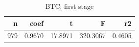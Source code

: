 \begin{table}
\caption{BTC: first stage}
\label{tab:t7_first_stage_BTC}
\begin{tabular}{rrrrr}
\toprule
n & coef & t & F & r2 \\
\midrule
979 & 0.9670 & 17.8971 & 320.3067 & 0.4605 \\
\bottomrule
\end{tabular}
\end{table}
